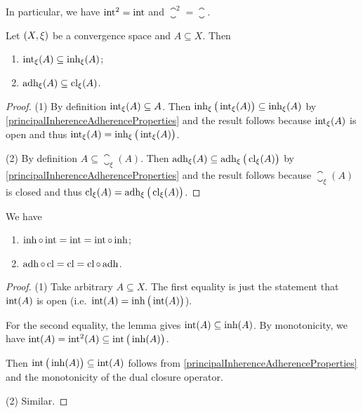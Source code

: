 In particular, we have $\operatorname{int}^2 = \operatorname{int}$ and $\closure^2 = \closure$.

\begin{lemma} \label{interiorInherenceInclusion}
Let $\left( X,\xi \right)$ be a convergence space and $A\subseteq X$. Then
\begin{enumerate}
\item $\operatorname{int}_\xi(A) \subseteq \operatorname{inh}_\xi(A)$;
\item $\operatorname{adh}_\xi(A) \subseteq \operatorname{cl}_\xi(A)$.
\end{enumerate}
\end{lemma}
\begin{proof}
(1) By definition $\operatorname{int}_\xi(A) \subseteq A$. Then $\operatorname{inh}_\xi\big(\operatorname{int}_\xi(A)\big) \subseteq \operatorname{inh}_\xi(A)$ by \ref{principalInherenceAdherenceProperties} and the result follows because $\operatorname{int}_\xi(A)$ is open and thus $\operatorname{int}_\xi(A) = \operatorname{inh}_\xi\big(\operatorname{int}_\xi(A)\big)$.

(2) By definition $A \subseteq \closure_\xi(A)$. Then $\operatorname{adh}_\xi(A) \subseteq \operatorname{adh}_\xi\big(\operatorname{cl}_\xi(A)\big)$ by \ref{principalInherenceAdherenceProperties} and the result follows because $\closure_\xi(A)$ is closed and thus $\operatorname{cl}_\xi(A) = \operatorname{adh}_\xi\big(\operatorname{cl}_\xi(A)\big)$.
\end{proof}
\begin{corollary} \label{interiorInherenceClosureAdherenceComposition}
We have
\begin{enumerate}
\item $\operatorname{inh} \circ \operatorname{int} = \operatorname{int} = \operatorname{int} \circ \operatorname{inh}$;
\item $\operatorname{adh}\circ \operatorname{cl} = \operatorname{cl} = \operatorname{cl} \circ \operatorname{adh}$.
\end{enumerate}
\end{corollary}
\begin{proof}
(1) Take arbitrary $A\subseteq X$. The first equality is just the statement that $\operatorname{int}(A)$ is open (i.e.\ $\operatorname{int}(A) = \operatorname{inh}\big(\operatorname{int}(A)\big)$).

For the second equality, the lemma gives $\operatorname{int}(A)\subseteq \operatorname{inh}(A)$. By monotonicity, we have $\operatorname{int}(A) = \operatorname{int}^2(A) \subseteq \operatorname{int}\big(\operatorname{inh}(A)\big)$.

Then $\operatorname{int}\big(\operatorname{inh}(A)\big) \subseteq \operatorname{int}(A)$ follows from \ref{principalInherenceAdherenceProperties} and the monotonicity of the dual closure operator.

(2) Similar.
\end{proof}

